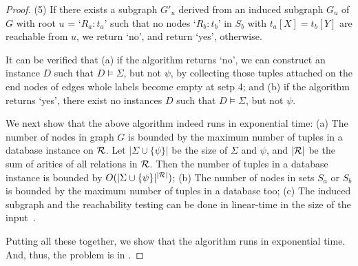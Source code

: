\begin{proof}
 \item[(5)] 
If there exists a subgraph $G'_u$ derived from  an induced subgraph $G_u$ of $G$ with root $u$ = `$R_a:t_a$' such that  no nodes `$R_b:t_b$' in $S_b$ with $t_a[X] = t_b[Y]$ are reachable from $u$, we return `no', and return `yes', otherwise. 
\ei


It can be verified that (a) if the algorithm returns `no', we can
construct an instance $D$ such that $D\models\Sigma$, but not
$\psi$, by collecting those tuples attached on the end nodes of edges whole labels become empty at setp 4; 
and (b) if the algorithm returns `yes', there exist no
instances $D$ such that $D\models\Sigma$, but not $\psi$.

We next show that the above algorithm indeed runs in exponential
time: (a) The number of nodes in graph $G$ is bounded by the maximum
number of tuples in a database instance on $\R$. Let
$|\Sigma\cup\{\psi\}|$ be the size of $\Sigma$ and $\psi$, and
$|\cal R|$ be the sum of arities of all relations in $\cal R$. Then
the number of tuples in a database instance is bounded by
$O(|\Sigma\cup\{\psi\}|^{|\cal
 R|})$; (b) The number of nodes in sets $S_a$ or $S_b$ is bounded by
the maximum number of tuples in a database too; (c) The induced subgraph and the reachability
testing can be done in linear-time in the size of the
input~\cite{CormenLRS01}.

Putting all these together, we show that the algorithm runs in
exponential time. And, thus, the problem is in \EXPTIME.
\end{proof}

